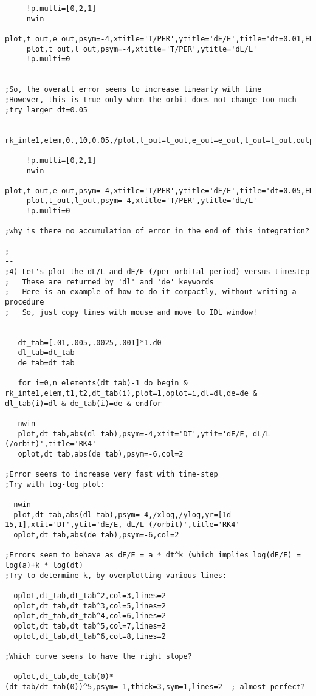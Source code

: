 \documentclass[12pt,landscape]{article}
\begin{document}
\begin{verbatim}
     !p.multi=[0,2,1]
     nwin
     plot,t_out,e_out,psym=-4,xtitle='T/PER',ytitle='dE/E',title='dt=0.01,EKS=0.5'
     plot,t_out,l_out,psym=-4,xtitle='T/PER',ytitle='dL/L'
     !p.multi=0


;So, the overall error seems to increase linearly with time
;However, this is true only when the orbit does not change too much
;try larger dt=0.05   

     rk_inte1,elem,0.,10,0.05,/plot,t_out=t_out,e_out=e_out,l_out=l_out,output=4

     !p.multi=[0,2,1]
     nwin
     plot,t_out,e_out,psym=-4,xtitle='T/PER',ytitle='dE/E',title='dt=0.05,EKS=0.5'
     plot,t_out,l_out,psym=-4,xtitle='T/PER',ytitle='dL/L'
     !p.multi=0

;why is there no accumulation of error in the end of this integration?

;-----------------------------------------------------------------------
;4) Let's plot the dL/L and dE/E (/per orbital period) versus timestep
;   These are returned by 'dl' and 'de' keywords   
;   Here is an example of how to do it compactly, without writing a procedure
;   So, just copy lines with mouse and move to IDL window!


   dt_tab=[.01,.005,.0025,.001]*1.d0
   dl_tab=dt_tab
   de_tab=dt_tab

   for i=0,n_elements(dt_tab)-1 do begin &  rk_inte1,elem,t1,t2,dt_tab(i),plot=1,oplot=i,dl=dl,de=de & dl_tab(i)=dl & de_tab(i)=de & endfor

   nwin
   plot,dt_tab,abs(dl_tab),psym=-4,xtit='DT',ytit='dE/E, dL/L (/orbit)',title='RK4'
   oplot,dt_tab,abs(de_tab),psym=-6,col=2

;Error seems to increase very fast with time-step
;Try with log-log plot:

  nwin
  plot,dt_tab,abs(dl_tab),psym=-4,/xlog,/ylog,yr=[1d-15,1],xtit='DT',ytit='dE/E, dL/L (/orbit)',title='RK4'
  oplot,dt_tab,abs(de_tab),psym=-6,col=2

;Errors seem to behave as dE/E = a * dt^k (which implies log(dE/E) = log(a)+k * log(dt)
;Try to determine k, by overplotting various lines:

  oplot,dt_tab,dt_tab^2,col=3,lines=2
  oplot,dt_tab,dt_tab^3,col=5,lines=2
  oplot,dt_tab,dt_tab^4,col=6,lines=2
  oplot,dt_tab,dt_tab^5,col=7,lines=2
  oplot,dt_tab,dt_tab^6,col=8,lines=2

;Which curve seems to have the right slope?

  oplot,dt_tab,de_tab(0)*(dt_tab/dt_tab(0))^5,psym=-1,thick=3,sym=1,lines=2  ; almost perfect?


\end{verbatim}
\end{document}
